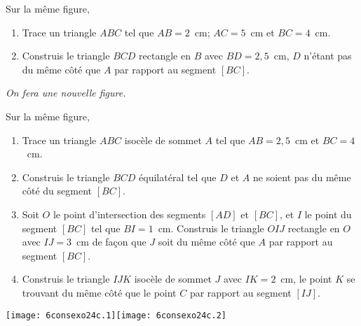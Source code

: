 \begin{myenumerate}
\item Sur la même figure,
  \begin{enumerate}
  \item Trace un triangle $ABC$ tel que $AB=2$~cm; $AC=5$~cm et
$BC=4$~cm.
  \item Construis le triangle $BCD$ rectangle en $B$ avec $BD=2,5$~cm,
$D$ n'étant pas du même côté que $A$ par rapport au segment $[BC]$.
  \end{enumerate}
\item {\em On fera une nouvelle figure.}\par Sur la même figure,
  \begin{enumerate}
  \item Trace un triangle $ABC$ isocèle de sommet $A$ tel que
$AB=2,5$~cm et $BC=4$~cm.
  \item Construis le triangle $BCD$ équilatéral tel que $D$ et $A$ ne
soient pas du même côté du segment $[BC]$.
  \item Soit $O$ le point d'intersection des segments $[AD]$ et
$[BC]$, et $I$ le point du segment $[BC]$ tel que $BI=1$~cm. Construis
le triangle $OIJ$ rectangle en $O$ avec $IJ=3$~cm de façon que $J$
soit du même côté que $A$ par rapport au segment $[BC]$.
  \item Construis le triangle $IJK$ isocèle de sommet $J$ avec
$IK=2$~cm, le point $K$ se trouvant du même côté que le point $C$ par
rapport au segment $[IJ]$.
  \end{enumerate}
\end{myenumerate}
\texttt{[image: 6consexo24c.1]}\hfill\texttt{[image: 6consexo24c.2]}